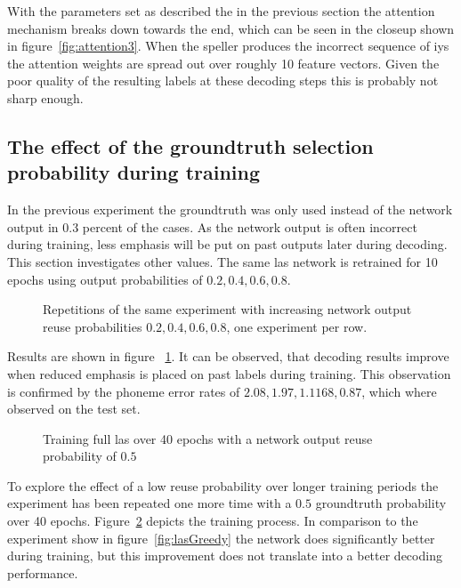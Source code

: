 With the parameters set as described the in the previous section the attention mechanism breaks down towards the end, which can be seen in the closeup shown in figure~\ref{fig:attention3}. When the speller produces the incorrect sequence of iys the attention weights are spread out over roughly 10 feature vectors. Given the poor quality of the resulting labels at these decoding steps this is probably not sharp enough.


\subsection{The effect of the groundtruth selection probability during training}
In the previous experiment the groundtruth was only used instead of the network output in 0.3 percent of the cases. As the network output is often incorrect during training, less emphasis will be put on past outputs later during decoding. This section investigates
other values. The same las network is retrained for 10 epochs using output probabilities of $0.2,0.4,0.6,0.8$.
\begin{figure}
\centering








\caption{Repetitions of the same experiment with increasing network output reuse probabilities $0.2, 0.4, 0.6, 0.8$, one experiment per row.}
\label{fig:lasGreedy2468}
\end{figure}
Results are shown in figure ~\ref{fig:lasGreedy2468}. It can be observed, that decoding results improve when reduced emphasis is placed on past labels during training. This observation is confirmed by the phoneme error rates of $2.08, 1.97, 1.1168, 0.87$, which where observed on the test set.
\begin{figure}[h]


\caption{Training full las over 40 epochs with a network output reuse probability of $0.5$}
\label{fig:lasGreedy05}
\end{figure}
To explore the effect of a low reuse probability over longer training periods the experiment has been repeated one more time with a $0.5$ groundtruth probability over 40 epochs.
Figure~\ref{fig:lasGreedy05} depicts the training process. In comparison to the experiment show in figure~\ref{fig:lasGreedy} the network does significantly better during training, but
this improvement does not translate into a better decoding performance.

